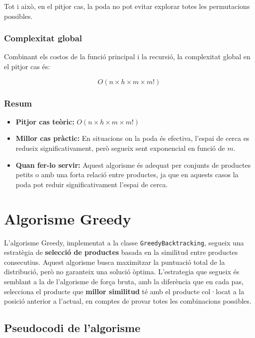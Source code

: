 \documentclass[a4paper,12pt]{report}
\begin{document}
\begin{itemize}
Tot i això, en el pitjor cas, la poda no pot evitar explorar totes les permutacions possibles.

\subsubsection{Complexitat global}

Combinant els costos de la funció principal i la recursió, la complexitat global en el pitjor cas és:

\[
O(n \times h \times m \times m!)
\]

\subsubsection{Resum}

\begin{itemize}
    \item \textbf{Pitjor cas teòric:} \(O(n \times h \times m \times m!)\)
    \item \textbf{Millor cas pràctic:} En situacions on la poda és efectiva, l'espai de cerca es redueix significativament, però segueix sent exponencial en funció de \(m\).
    \item \textbf{Quan fer-lo servir:} Aquest algorisme és adequat per conjunts de productes petits o amb una forta relació entre productes, ja que en aquests casos la poda pot reduir significativament l'espai de cerca.
\end{itemize}


\section{Algorisme Greedy}

L'algorisme Greedy, implementat a la classe \texttt{GreedyBacktracking}, segueix una estratègia de \textbf{selecció de productes} basada en la similitud entre productes consecutius. Aquest algorisme busca maximitzar la puntuació total de la distribució, però no garanteix una solució òptima.
\newline
L'estrategia que segueix és semblant a la de l'algorisme de força bruta, amb la diferència que en cada pas, selecciona el producte que \textbf{millor similitud} té amb el producte col·locat a la posició anterior a l'actual, en comptes de provar totes les combinacions possibles.

\subsection{Pseudocodi de l'algorisme}


\end{itemize}
\end{document}
